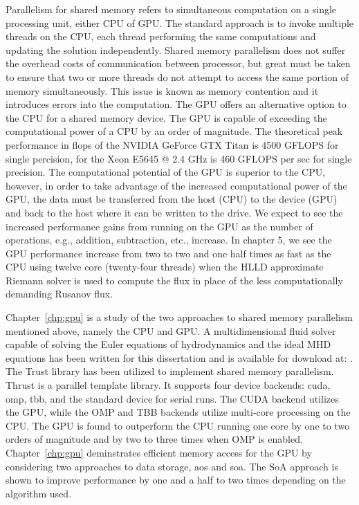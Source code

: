Parallelism for shared memory refers to simultaneous computation on a single processing unit, either CPU of GPU.  The standard approach is to invoke multiple threads on the CPU, each thread performing the same computations and updating the solution independently.  Shared memory parallelism does not suffer the overhead costs of communication between processor, but great must be taken to ensure that two or more threads do not attempt to access the same portion of memory simultaneously.  This issue is known as memory contention and it introduces errors into the computation.  The GPU offers an alternative option to the CPU for a shared memory device.  The GPU is capable of exceeding the computational power of a CPU by an order of magnitude.  The theoretical peak performance in \gls{flops} of the NVIDIA GeForce GTX Titan is 4500 GFLOPS for single percision, for the Xeon E5645 @ 2.4 GHz is 460 GFLOPS per sec for single precision.  The computational potential of the GPU is superior to the CPU, however, in order to take advantage of the increased computational power of the GPU, the data must be transferred from the host (CPU) to the device (GPU) and back to the host where it can be written to the drive.  We expect to see the increased performance gains from running on the GPU as the number of operations, e.g., addition, subtraction, etc., increase.  In chapter 5, we see the GPU performance increase from two to two and one half times as fast as the CPU using twelve core (twenty-four threads) when the HLLD approximate Riemann solver is used to compute the flux in place of the less computationally demanding Rusanov flux.

Chapter~\ref{chp:gpu} is a study of the two approaches to shared memory parallelism mentioned above, namely the CPU and GPU.  A multidimensional fluid solver capable of solving the Euler equations of hydrodynamics and the ideal MHD equations has been written for this dissertation and is available for download at: \protect\gitrepo.  The Trust \citep{Thrust} library has been utilized to implement shared memory parallelism.  Thrust is a \cpp parallel template library.  It supports four device backends: \gls{cuda}, \gls{omp}, \gls{tbb}, and the standard \cpp device for serial runs.  The CUDA backend utilizes the GPU, while the OMP and TBB backends utilize multi-core processing on the CPU.  The GPU is found to outperform the CPU running one core by one to two orders of magnitude and by two to three times when OMP is enabled.  Chapter~\ref{chp:gpu} deminstrates efficient memory access for the GPU by considering two approaches to data storage, \gls{aos} and \gls{soa}.  The SoA approach is shown to improve performance by one and a half to two times depending on the algorithm used.  
              





